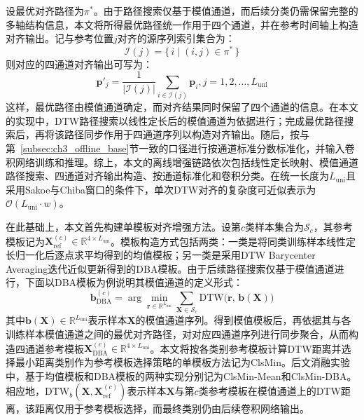 \documentclass{xdupgthesis}
\begin{document}
设最优对齐路径为$\pi^\ast$。由于路径搜索仅基于模值通道，而后续分类仍需保留完整的多轴结构信息，本文将所得最优路径统一作用于四个通道，并在参考时间轴上构造对齐输出。记与参考位置$j$对齐的源序列索引集合为：
\begin{equation}
    \mathcal{I}(j)=\{\,i\mid (i,j)\in\pi^\ast\,\}
\end{equation}
则对应的四通道对齐输出可写为：
\begin{equation}
    \mathbf{p}'_j=\frac{1}{|\mathcal{I}(j)|}\sum_{i\in\mathcal{I}(j)}\mathbf{p}_i, j=1,2,\ldots,L_{\mathrm{uni}}
\end{equation}
这样，最优路径由模值通道确定，而对齐结果同时保留了四个通道的信息。在本文的实现中，DTW路径搜索以线性定长后的模值通道为依据进行；完成最优路径搜索后，再将该路径同步作用于四通道序列以构造对齐输出。随后，按与第~\ref{subsec:ch3_offline_base}节一致的口径进行按通道标准分数标准化，并输入卷积网络训练和推理。综上，本文的离线增强链路依次包括线性定长映射、模值通道路径搜索、四通道对齐输出构造、按通道标准化和卷积分类。在统一长度为$L_{\mathrm{uni}}$且采用Sakoe与Chiba窗口的条件下，单次DTW对齐的复杂度可近似表示为$\mathcal{O}(L_{\mathrm{uni}}\cdot w)$。

在此基础上，本文首先构建单模板对齐增强方法。设第$c$类样本集合为$\mathcal{S}_c$，其参考模板记为$\mathbf{X}_{\mathrm{ref}}^{(c)}\in\mathbb{R}^{4\times L_{\mathrm{uni}}}$。模板构造方式包括两类：一类是将同类训练样本线性定长归一化后逐点求平均得到的均值模板；另一类是采用DTW Barycenter Averaging迭代近似更新得到的DBA模板\cite{ch3_petitjean2011dba}。由于后续路径搜索仅基于模值通道进行，下面以DBA模板为例说明其模值通道的定义形式：
\begin{equation}
    \mathbf{b}_{\mathrm{DBA}}^{(c)}
    =
    \arg\min_{\mathbf{r}\in\mathbb{R}^{L_{\mathrm{uni}}}}
    \sum_{\mathbf{X}\in\mathcal{S}_c}
    \mathrm{DTW}\big(\mathbf{r},\,\mathbf{b}(\mathbf{X})\big)
\end{equation}
其中$\mathbf{b}(\mathbf{X})\in\mathbb{R}^{L_{\mathrm{uni}}}$表示样本$\mathbf{X}$的模值通道序列。得到模值模板后，再依据其与各训练样本模值通道之间的最优对齐路径，对对应四通道序列进行同步聚合，从而构造四通道参考模板$\mathbf{X}_{\mathrm{DBA}}^{(c)}\in\mathbb{R}^{4\times L_{\mathrm{uni}}}$。本文将按各类别参考模板计算DTW距离并选择最小距离类别作为参考模板选择策略的单模板方法记为ClsMin。后文消融实验中，基于均值模板和DBA模板的两种实现分别记为ClsMin-Mean和ClsMin-DBA。
相应地，$\mathrm{DTW}_{b}(\mathbf{X},\mathbf{X}_{\mathrm{ref}}^{(c)})$表示样本$\mathbf{X}$与第$c$类参考模板在模值通道上的DTW距离，该距离仅用于参考模板选择，而最终类别仍由后续卷积网络输出。
\end{document}
